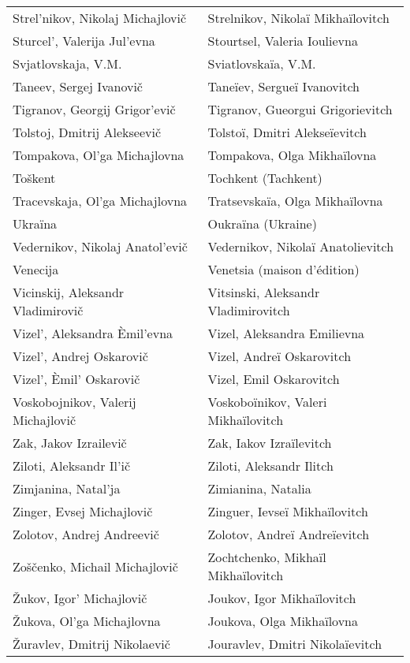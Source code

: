{\begin{longtable}[c]{ll}
 \\
 Strel'nikov, Nikolaj Michajlovič
 & Strelnikov, Nikolaï Mikhaïlovitch
 \\
 Sturcel', Valerija Jul'evna
 & Stourtsel, Valeria Ioulievna
 \\
 Svjatlovskaja, V.M.
 & Sviatlovskaïa, V.M.
 \\
 Taneev, Sergej Ivanovič
 & Taneïev, Sergueï Ivanovitch
 \\
 Tigranov, Georgij Grigor'evič
 & Tigranov, Gueorgui Grigorievitch
 \\
 Tolstoj, Dmitrij Alekseevič
 & Tolstoï, Dmitri Alekseïevitch
 \\
 Tompakova, Ol'ga Michajlovna
 & Tompakova, Olga Mikhaïlovna
 \\
 Toškent
 & Tochkent (Tachkent)
 \\
 Tracevskaja, Ol'ga Michajlovna
 & Tratsevskaïa, Olga Mikhaïlovna
 \\
 Ukraïna
 & Oukraïna (Ukraine)
 \\
 Vedernikov, Nikolaj Anatol'evič
 & Vedernikov, Nikolaï Anatolievitch
 \\
 Venecija
 & Venetsia (maison d'édition)
 \\
 Vicinskij, Aleksandr Vladimirovič
 & Vitsinski, Aleksandr Vladimirovitch
 \\
 Vizel', Aleksandra Èmil'evna
 & Vizel, Aleksandra Emilievna
 \\
 Vizel', Andrej Oskarovič
 & Vizel, Andreï Oskarovitch
 \\
 Vizel', Èmil' Oskarovič
 & Vizel, Emil Oskarovitch
 \\
 Voskobojnikov, Valerij Michajlovič
 & Voskoboïnikov, Valeri Mikhaïlovitch
 \\
 Zak, Jakov Izrailevič
 & Zak, Iakov Izraïlevitch
 \\
 Ziloti, Aleksandr Il'ič
 & Ziloti, Aleksandr Ilitch
 \\
 Zimjanina, Natal'ja
 & Zimianina, Natalia
 \\
 Zinger, Evsej Michajlovič
 & Zinguer, Ievseï Mikhaïlovitch
 \\
 Zolotov, Andrej Andreevič
 & Zolotov, Andreï Andreïevitch
 \\
 Zoščenko, Michail Michajlovič
 & Zochtchenko, Mikhaïl Mikhaïlovitch
 \\
 Žukov, Igor' Michajlovič
 & Joukov, Igor Mikhaïlovitch
 \\
 Žukova, Ol'ga Michajlovna
 & Joukova, Olga Mikhaïlovna
 \\
 Žuravlev, Dmitrij Nikolaevič
 & Jouravlev, Dmitri Nikolaïevitch
 \\
\end{longtable}}
